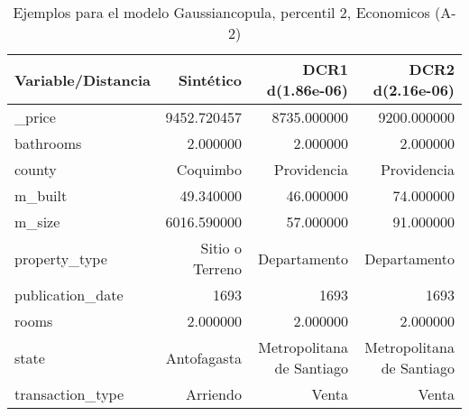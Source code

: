 \begin{table}[H]
\centering
\fontsize{10}{14}\selectfont
\caption{Ejemplos para el modelo Gaussiancopula, percentil 2, Economicos (A-2)}
\label{table-example-economicos-a-2-gaussiancopula-2p}
\begin{tabular}{|l|r|r|r|}
\hline
\rowcolor[gray]{0.8}
Variable/Distancia & Sintético & DCR1 d(1.86e-06) & DCR2 d(2.16e-06) \\
\hline \_price & \cellcolor[rgb]{0.9, 0.54, 0.52} 9452.720457 & 8735.000000 & 9200.000000 \\
\hline bathrooms & \cellcolor[rgb]{0.9, 0.54, 0.52} 2.000000 & \cellcolor[rgb]{0.9, 0.54, 0.52} 2.000000 & \cellcolor[rgb]{0.9, 0.54, 0.52} 2.000000 \\
\hline county & \cellcolor[rgb]{0.9, 0.54, 0.52} Coquimbo & Providencia & Providencia \\
\hline m\_built & \cellcolor[rgb]{0.9, 0.54, 0.52} 49.340000 & 46.000000 & 74.000000 \\
\hline m\_size & \cellcolor[rgb]{0.9, 0.54, 0.52} 6016.590000 & 57.000000 & 91.000000 \\
\hline property\_type & \cellcolor[rgb]{0.9, 0.54, 0.52} Sitio o Terreno & Departamento & Departamento \\
\hline publication\_date & \cellcolor[rgb]{0.9, 0.54, 0.52} 1693 & \cellcolor[rgb]{0.9, 0.54, 0.52} 1693 & \cellcolor[rgb]{0.9, 0.54, 0.52} 1693 \\
\hline rooms & \cellcolor[rgb]{0.9, 0.54, 0.52} 2.000000 & \cellcolor[rgb]{0.9, 0.54, 0.52} 2.000000 & \cellcolor[rgb]{0.9, 0.54, 0.52} 2.000000 \\
\hline state & \cellcolor[rgb]{0.9, 0.54, 0.52} Antofagasta & Metropolitana de Santiago & Metropolitana de Santiago \\
\hline transaction\_type & \cellcolor[rgb]{0.9, 0.54, 0.52} Arriendo & Venta & Venta \\
\hline
\end{tabular}
\end{table}
